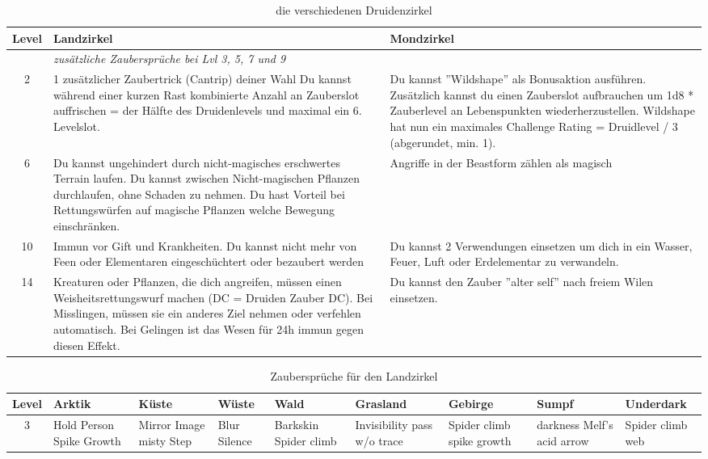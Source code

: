 \begin{table}
	\centering
	\begin{tabular}{cp{6cm}p{6cm}}
	\textbf{Level} & \textbf{Landzirkel} & \textbf{Mondzirkel} \\ \hline
	& \textit{zusätzliche Zaubersprüche bei Lvl 3, 5, 7 und 9} & \\ \hline
	2 &
	1 zusätzlicher Zaubertrick (Cantrip) deiner Wahl \linebreak
	Du kannst während einer kurzen Rast kombinierte Anzahl an Zauberslot auffrischen = der Hälfte des Druidenlevels und maximal ein 6. Levelslot. &
	Du kannst ''Wildshape'' als Bonusaktion ausführen. Zusätzlich kannst du einen Zauberslot aufbrauchen um 1d8 * Zauberlevel an Lebenspunkten wiederherzustellen. Wildshape hat nun ein maximales Challenge Rating = Druidlevel / 3 (abgerundet, min. 1). \\ \hline
	
	6 &
	Du kannst ungehindert durch nicht-magisches erschwertes Terrain laufen. Du kannst zwischen Nicht-magischen Pflanzen durchlaufen, ohne Schaden zu nehmen.\linebreak
	Du hast Vorteil bei Rettungswürfen auf magische Pflanzen welche Bewegung einschränken. &
	Angriffe in der Beastform zählen als magisch\\ \hline
	
	10 &
	Immun vor Gift und Krankheiten. Du kannst nicht mehr von Feen oder Elementaren eingeschüchtert oder bezaubert werden &
	Du kannst 2 Verwendungen einsetzen um dich in ein Wasser, Feuer, Luft oder Erdelementar zu verwandeln. \\ \hline
	
	14 &
	Kreaturen oder Pflanzen, die dich angreifen, müssen einen Weisheitsrettungswurf machen (DC = Druiden Zauber DC). Bei Misslingen, müssen sie ein anderes Ziel nehmen oder verfehlen automatisch. Bei Gelingen ist das Wesen für 24h immun gegen diesen Effekt. &
	Du kannst den Zauber ''alter self'' nach freiem Wilen einsetzen.\\
	\end{tabular}
	\caption{die verschiedenen Druidenzirkel}
\end{table}

\clearpage
\begin{table}
	\centering
	\begin{tabular}{cp{3cm}p{3cm}p{3cm}p{3cm}p{3cm}p{3cm}p{3cm}p{2cm}}
	\textbf{Level} & \textbf{Arktik} & \textbf{Küste} & \textbf{Wüste} & \textbf{Wald} & \textbf{Grasland} & \textbf{Gebirge} & \textbf{Sumpf} & \textbf{Underdark} \\ \hline
	3 & 
	\textbullet Hold Person \textbullet Spike Growth & 
	\textbullet Mirror Image \textbullet misty Step & 
	\textbullet Blur \textbullet Silence &
	\textbullet Barkskin \textbullet Spider climb & 
	\textbullet Invisibility \textbullet pass w/o trace & 
	\textbullet Spider climb \textbullet spike growth & 
	\textbullet darkness \textbullet Melf's acid arrow & 
	\textbullet Spider climb \textbullet web \\ \hline
	
	\end{tabular}
	\caption{Zaubersprüche für den Landzirkel}
\end{table}